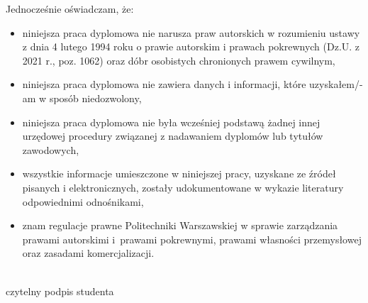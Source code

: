\documentclass[10pt,twoside,a4paper]{article}
\begin{document}
		Jednocześnie oświadczam, że: 
		\begin{itemize}[label=---] \setlength\itemsep{0.1em}
			\item 
			niniejsza praca dyplomowa nie narusza praw autorskich w rozumieniu ustawy z dnia 4 lutego 1994 roku o prawie autorskim i prawach pokrewnych (Dz.U. z 2021 r., poz. 1062) oraz dóbr osobistych chronionych prawem cywilnym,
			\item 
			niniejsza praca dyplomowa nie zawiera danych i informacji, które uzyskałem/-am  	w sposób niedozwolony, 
			\item 
			niniejsza praca dyplomowa nie była wcześniej podstawą żadnej innej urzędowej procedury związanej z nadawaniem dyplomów lub tytułów zawodowych, 
			\item 
			wszystkie informacje umieszczone w niniejszej pracy, uzyskane ze źródeł pisanych  i elektronicznych, zostały udokumentowane w wykazie literatury odpowiednimi odnośnikami, 
			\item 
			znam regulacje prawne Politechniki Warszawskiej w sprawie zarządzania prawami autorskimi  i~prawami pokrewnymi, prawami własności przemysłowej oraz zasadami komercjalizacji.  
		\end{itemize}
	\vspace{30pt}
	\begin{flushright}
		\begin{minipage}{0.33\linewidth}
			\begin{center}
				\dotfill  \\ \vspace{-5pt}
				czytelny podpis studenta
			\end{center}
		\end{minipage}
		\begin{minipage}{0.025\linewidth}
			$\phantom{0}$
		\end{minipage}
	\end{flushright}
		
\end{document}
